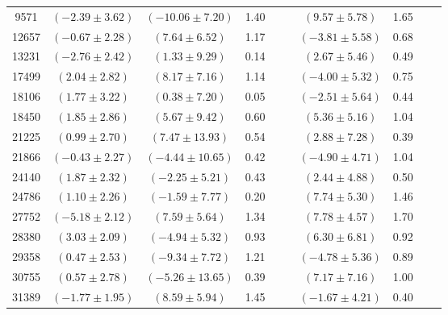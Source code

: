 \documentclass [10pt, twoside] {uwthesis}[2012/04/02]
\begin{document}
{\begin{longtable}[t]{|c|c|cccc|cccc|}
9571	&  $(	-2.39	  \pm  	3.62	)$  &  $(	-10.06	  \pm  	7.20	)$  &  	1.40	  &  		  &  		  &  $(	9.57	  \pm  	5.78	)$  &  	1.65	  &  		  &  		  \\
12657	&  $(	-0.67	  \pm  	2.28	)$  &  $(	7.64	  \pm  	6.52	)$  &  	1.17	  &  		  &  		  &  $(	-3.81	  \pm  	5.58	)$  &  	0.68	  &  		  &  		  \\
13231	&  $(	-2.76	  \pm  	2.42	)$  &  $(	1.33	  \pm  	9.29	)$  &  	0.14	  &  		  &  		  &  $(	2.67	  \pm  	5.46	)$  &  	0.49	  &  		  &  		  \\
17499	&  $(	2.04	  \pm  	2.82	)$  &  $(	8.17	  \pm  	7.16	)$  &  	1.14	  &  		  &  		  &  $(	-4.00	  \pm  	5.32	)$  &  	0.75	  &  		  &  		  \\
18106	&  $(	1.77	  \pm  	3.22	)$  &  $(	0.38	  \pm  	7.20	)$  &  	0.05	  &  		  &  		  &  $(	-2.51	  \pm  	5.64	)$  &  	0.44	  &  		  &  		  \\
18450	&  $(	1.85	  \pm  	2.86	)$  &  $(	5.67	  \pm  	9.42	)$  &  	0.60	  &  		  &  		  &  $(	5.36	  \pm  	5.16	)$  &  	1.04	  &  		  &  		  \\
21225	&  $(	0.99	  \pm  	2.70	)$  &  $(	7.47	  \pm  	13.93	)$  &  	0.54	  &  		  &  		  &  $(	2.88	  \pm  	7.28	)$  &  	0.39	  &  		  &  		  \\
21866	&  $(	-0.43	  \pm  	2.27	)$  &  $(	-4.44	  \pm  	10.65	)$  &  	0.42	  &  		  &  		  &  $(	-4.90	  \pm  	4.71	)$  &  	1.04	  &  		  &  		  \\
24140	&  $(	1.87	  \pm  	2.32	)$  &  $(	-2.25	  \pm  	5.21	)$  &  	0.43	  &  		  &  		  &  $(	2.44	  \pm  	4.88	)$  &  	0.50	  &  		  &  		  \\
24786	&  $(	1.10	  \pm  	2.26	)$  &  $(	-1.59	  \pm  	7.77	)$  &  	0.20	  &  		  &  		  &  $(	7.74	  \pm  	5.30	)$  &  	1.46	  &  		  &  		  \\
27752	&  $(	-5.18	  \pm  	2.12	)$  &  $(	7.59	  \pm  	5.64	)$  &  	1.34	  &  		  &  		  &  $(	7.78	  \pm  	4.57	)$  &  	1.70	  &  		  &  		  \\
28380	&  $(	3.03	  \pm  	2.09	)$  &  $(	-4.94	  \pm  	5.32	)$  &  	0.93	  &  		  &  		  &  $(	6.30	  \pm  	6.81	)$  &  	0.92	  &  		  &  		  \\
29358	&  $(	0.47	  \pm  	2.53	)$  &  $(	-9.34	  \pm  	7.72	)$  &  	1.21	  &  		  &  		  &  $(	-4.78	  \pm  	5.36	)$  &  	0.89	  &  		  &  		  \\
30755	&  $(	0.57	  \pm  	2.78	)$  &  $(	-5.26	  \pm  	13.65	)$  &  	0.39	  &  		  &  		  &  $(	7.17	  \pm  	7.16	)$  &  	1.00	  &  		  &  		  \\
31389	&  $(	-1.77	  \pm  	1.95	)$  &  $(	8.59	  \pm  	5.94	)$  &  	1.45	  &  		  &  		  &  $(	-1.67	  \pm  	4.21	)$  &  	0.40	  &  		  &  		  \\

\end{longtable}}
\end{document}
